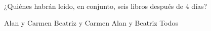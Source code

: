 ¿Quiénes habr\'an leido, en conjunto, seis libros despu\'es de 4 d\'ias?

\begin{choices}
    \choice Alan y Carmen
    \CorrectChoice Beatriz y Carmen
    \choice Alan y Beatriz
    \choice Todos
\end{choices}